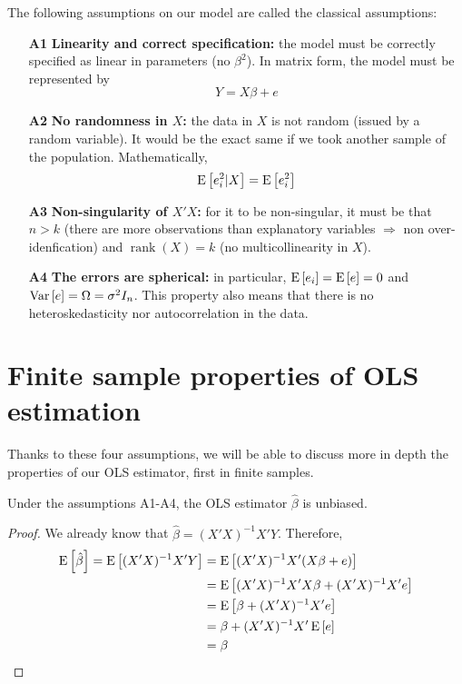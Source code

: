 \begin{definition}
The following assumptions on our model are called the classical assumptions:
\begin{itemize}
\item[\textbf{A1}]\textbf{Linearity and correct specification:} the model must be correctly specified as linear in parameters (no $\beta^2$). In matrix form, the model must be represented by $$Y = X\beta + e$$
\item[\textbf{A2}]\textbf{No randomness in $X$:} the data in $X$ is not random (issued by a random variable). It would be the exact same if we took another sample of the population. Mathematically, $$\operatorname{E}\left[e_i^2|X\right] = \operatorname{E}\left[e_i^2\right]$$
\item[\textbf{A3}]\textbf{Non-singularity of $X'X$:} for it to be non-singular, it must be that $n>k$ (there are more observations than explanatory variables $\Rightarrow$ non over-idenfication) and $\operatorname{rank}(X) = k$ (no multicollinearity in $X$).
\item[\textbf{A4}]\textbf{The errors are spherical:} in particular, $\operatorname{E}\left[e_i\right] = \operatorname{E}\left[e\right] = 0$ and $\operatorname{Var}\left[e\right] = \Omega = \sigma^2I_n$. This property also means that there is no heteroskedasticity nor autocorrelation in the data.
\end{itemize}
\end{definition}


\section{Finite sample properties of OLS estimation}
Thanks to these four assumptions, we will be able to discuss more in depth the properties of our OLS estimator, first in finite samples.

\begin{remark}
Under the assumptions A1-A4, the OLS estimator $\hat\beta$ is unbiased.
\end{remark}
\begin{proof}
We already know that $\hat\beta = (X'X)^{-1}X'Y$. Therefore, \begin{align*}
\operatorname{E}\left[\hat\beta\right] = \operatorname{E}\left[(X'X)^{-1}X'Y\right] & = \operatorname{E}\left[(X'X)^{-1}X'(X\beta + e)\right]\\
& = \operatorname{E}\left[(X'X)^{-1}X'X\beta + (X'X)^{-1}X'e\right]\\
& = \operatorname{E}\left[\beta + (X'X)^{-1}X'e\right]\\
& = \beta + (X'X)^{-1}X'\operatorname{E}\left[e\right]\\
& = \beta
\end{align*}
\end{proof}

